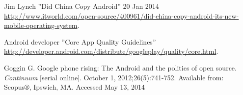 \documentclass[conference]{IEEEtran}
\begin{document}
\begin{thebibliography}{1}



Jim Lynch ''Did China Copy Android''  20 Jan 2014 \url{http://www.itworld.com/open-source/400961/did-china-copy-android-its-new-mobile-operating-system}.

Android developer ''Core App Quality Guidelines''
\url{http://developer.android.com/distribute/googleplay/quality/core.html}.

Goggin G. Google phone rising: The Android and the politics of open source. \textit{Continuum} [serial online]. October 1, 2012;26(5):741-752. Available from: Scopus®, Ipswich, MA. Accessed May 13, 2014

\end{thebibliography}
\end{document}
